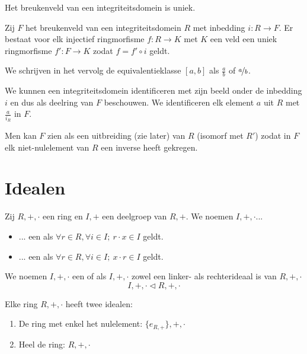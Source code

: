 \documentclass[main.tex]{subfiles}
\begin{document}
\begin{ei}
  Het breukenveld van een integriteitsdomein is uniek.
  \zb
\end{ei}

\begin{ei}
  Zij $F$ het breukenveld van een integriteitsdomein $R$ met inbedding $i: R \rightarrow F$.
  Er bestaat voor elk injectief ringmorfisme $f: R \rightarrow K$ met $K$ een veld een uniek ringmorfisme $f': F \rightarrow K$ zodat $f = f' \circ i$ geldt.
  \zb
\end{ei}

\begin{de}
  We schrijven in het vervolg de equivalentieklasse $[a,b]$ als $\frac{a}{b}$ of $\nicefrac{a}{b}$.
\end{de}

\begin{opm}
  We kunnen een integriteitsdomein identificeren met zijn beeld onder de inbedding $i$ en dus als deelring van $F$ beschouwen.
  We identificeren elk element $a$ uit $R$ met $\frac{a}{i_{R}}$ in $F$.
\end{opm}

\begin{opm}
  Men kan $F$ zien als een uitbreiding (zie later) van $R$ (isomorf met $R'$) zodat in $F$ elk niet-nulelement van $R$ een inverse heeft gekregen.
\end{opm}


\section{Idealen}
\label{sec:idealen}

\begin{de}
  Zij $R,+,\cdot$ een ring en $I,+$ een deelgroep van $R,+$.
  We noemen $I,+,\cdot$...
  \begin{itemize}
  \item ... een  als $\forall r\in R, \forall i\in I;\ r \cdot x \in I$ geldt.
  \item ... een  als $\forall r\in R, \forall i\in I;\ x \cdot r \in I$ geldt.
  \end{itemize}
  We noemen $I,+,\cdot$ een  of  als $I,+,\cdot$ zowel een linker- als rechterideaal is van $R,+,\cdot$
  \[ I,+,\cdot \triangleleft R,+,\cdot \]
\end{de}

\begin{st}
  Elke ring $R,+,\cdot$ heeft twee idealen:
  \begin{enumerate}
  \item De ring met enkel het nulelement: $\{e_{R,+}\},+,\cdot$
  \item Heel de ring: $R,+,\cdot$
  \end{enumerate}
\end{st}
\end{document}
